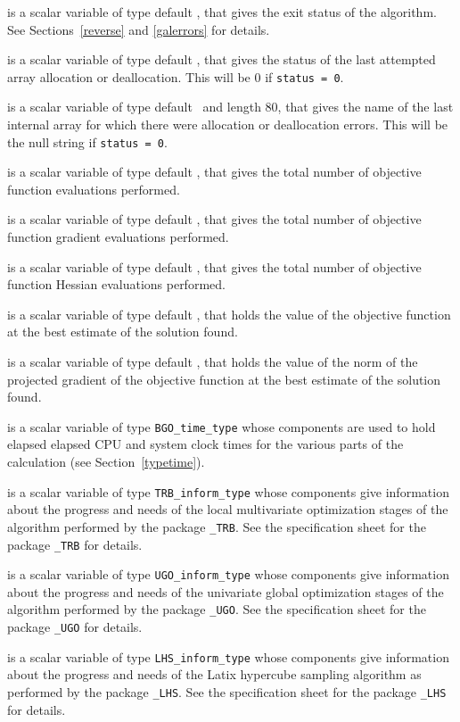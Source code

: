 \documentclass{galahad}
\newcommand{\packagename}{BGO}
\begin{document}
\begin{description}
 is a scalar variable of type default \integer, that gives the
exit status of the algorithm.
See Sections~\ref{reverse} and \ref{galerrors}
for details.

 is a scalar variable of type default \integer, that gives
the status of the last attempted array allocation or deallocation.
This will be 0 if {\tt status = 0}.

 is a scalar variable of type default \character\
and length 80, that  gives the name of the last internal array
for which there were allocation or deallocation errors.
This will be the null string if {\tt status = 0}.

 is a scalar variable of type default \integer, that gives the
total number of objective function evaluations performed.

 is a scalar variable of type default \integer, that gives the
total number of objective function gradient evaluations performed.

 is a scalar variable of type default \integer, that gives the
total number of objective function Hessian evaluations performed.

 is a scalar variable of type default \realdp, that holds the
value of the objective function at the best estimate of the solution found.

 is a scalar variable of type default \realdp, that holds the
value of the norm of the projected gradient of the objective function
at the best estimate of the solution found.

 is a scalar variable of type {\tt \packagename\_time\_type}
whose components are used to hold elapsed elapsed CPU and system clock
times for the various parts of the calculation (see Section~\ref{typetime}).

 is a scalar variable of type
{\tt TRB\_inform\_type}
whose components give information about the progress and needs of the local
multivariate optimization stages of the algorithm performed by the package
{\tt \libraryname\_TRB}.
See the specification sheet for the package
{\tt \libraryname\_TRB}
for details.

 is a scalar variable of type
{\tt UGO\_inform\_type}
whose components give information about the progress and needs of the
univariate global optimization stages of the algorithm performed by the package
{\tt \libraryname\_UGO}.
See the specification sheet for the package
{\tt \libraryname\_UGO}
for details.

 is a scalar variable of type
{\tt LHS\_inform\_type}
whose components give information about the progress and needs
of the Latix hypercube sampling algorithm as performed by the package
{\tt \libraryname\_LHS}.
See the specification sheet for the package
{\tt \libraryname\_LHS}
for details.

\end{description}
\end{document}
